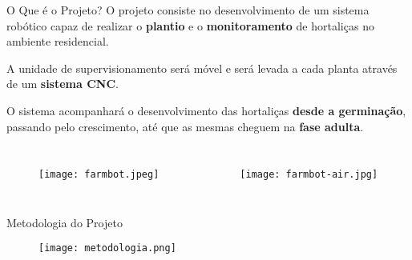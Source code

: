\begin{frame}[t]{O Que é o Projeto?}
    \newcommand\vertspaceoque{0.35cm}
    O projeto consiste no desenvolvimento de um sistema robótico capaz de realizar o \textbf{plantio} e o \textbf{monitoramento} de hortaliças no ambiente residencial.
    \vspace*{\vertspaceoque}

    A unidade de supervisionamento será móvel e será levada a cada planta através de um \textbf{sistema CNC}.
    \vspace*{\vertspaceoque}

    O sistema acompanhará o desenvolvimento das hortaliças \textbf{desde a germinação}, passando pelo crescimento, até que as mesmas cheguem na \textbf{fase adulta}.

    \vspace{-0.2cm}
    \begin{columns}[t]
        \begin{figure}
            \texttt{[image: farmbot.jpeg]}
        \end{figure}

        \begin{figure}
            \texttt{[image: farmbot-air.jpg]}
        \end{figure}
    \end{columns}
\end{frame}

\begin{frame}[t]{Metodologia do Projeto}
    \begin{figure}
        \texttt{[image: metodologia.png]}
    \end{figure}
\end{frame}

